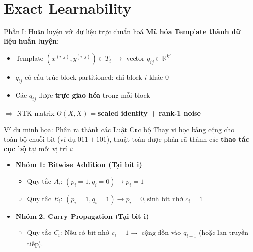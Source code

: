 
\section{Exact Learnability}

\begin{frame}{Phần I: Huấn luyện với dữ liệu trực chuẩn hoá}
  \textbf{Mã hóa Template thành dữ liệu huấn luyện:}
  \begin{itemize}
    \item Template $(x^{(i,j)}, y^{(i,j)}) \in T_i$ $\to$ vector $q_{ij} \in \mathbb{R}^{k'}$
    \item $q_{ij}$ có cấu trúc block-partitioned: chỉ block $i$ khác 0
    \item Các $q_{ij}$ được \textbf{trực giao hóa} trong mỗi block
  \end{itemize}

  \vspace{0.3cm}
  $\Rightarrow$ NTK matrix $\Theta(X,X)$ = \textbf{scaled identity + rank-1 noise}
\end{frame}

\begin{frame}{Ví dụ minh họa: Phân rã thành các Luật Cục bộ}
  Thay vì học bảng cộng cho toàn bộ chuỗi bit (ví dụ $011 + 101$), thuật toán được phân rã thành các \textbf{thao tác cục bộ} tại mỗi vị trí $i$:

  \begin{itemize}
    \item \textbf{Nhóm 1: Bitwise Addition (Tại bit i)}
      \begin{itemize}
        \item Quy tắc $A_i$: $(p_i=1, q_i=0) \to p_i=1$
        \item Quy tắc $B_i$: $(p_i=1, q_i=1) \to p_i=0, \text{sinh bit nhớ } c_i=1$
      \end{itemize}
    
    \item \textbf{Nhóm 2: Carry Propagation (Tại bit i)}
      \begin{itemize}
        \item Quy tắc $C_i$: Nếu có bit nhớ $c_i=1 \to$ cộng dồn vào $q_{i+1}$ (hoặc lan truyền tiếp).
      \end{itemize}
  \end{itemize}


\end{frame}


